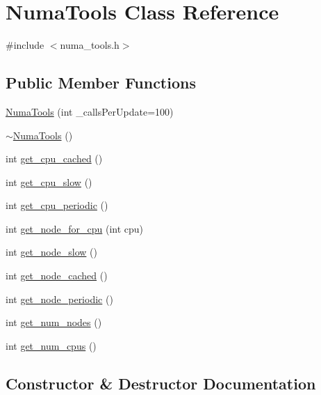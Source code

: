 \hypertarget{classNumaTools}{}\section{Numa\+Tools Class Reference}
\label{classNumaTools}


{\ttfamily \#include $<$numa\+\_\+tools.\+h$>$}

\subsection*{Public Member Functions}
\begin{DoxyCompactItemize}
\item 
\hyperlink{classNumaTools_aafcc9a9476cf975b4bd2f6a252f569aa}{Numa\+Tools} (int \+\_\+calls\+Per\+Update=100)
\item 
\hyperlink{classNumaTools_ae09d46d3c469d6151b93c3d96a1ff638}{$\sim$\+Numa\+Tools} ()
\item 
int \hyperlink{classNumaTools_aa1f63a07dbd4cf3795a9c37635995c8c}{get\+\_\+cpu\+\_\+cached} ()
\item 
int \hyperlink{classNumaTools_aac14b435a11ec52d02014783438d9ca4}{get\+\_\+cpu\+\_\+slow} ()
\item 
int \hyperlink{classNumaTools_ad67628c3c37072be89b377efd8aeca5d}{get\+\_\+cpu\+\_\+periodic} ()
\item 
int \hyperlink{classNumaTools_a15f467a2f27852c3f20c73c15e506cd1}{get\+\_\+node\+\_\+for\+\_\+cpu} (int cpu)
\item 
int \hyperlink{classNumaTools_ae073412f2df74a862553f218f887c94d}{get\+\_\+node\+\_\+slow} ()
\item 
int \hyperlink{classNumaTools_a8d7519f7caee2c3de6ffed4da724f125}{get\+\_\+node\+\_\+cached} ()
\item 
int \hyperlink{classNumaTools_a648fb73d8291e0d026c4e1921d17412b}{get\+\_\+node\+\_\+periodic} ()
\item 
int \hyperlink{classNumaTools_a9ba5a103276fdea894b82e7375ed1bf6}{get\+\_\+num\+\_\+nodes} ()
\item 
int \hyperlink{classNumaTools_af932989447a90e30f66f48d637fa46bf}{get\+\_\+num\+\_\+cpus} ()
\end{DoxyCompactItemize}


\subsection{Constructor \& Destructor Documentation}
\mbox{\label{classNumaTools_aafcc9a9476cf975b4bd2f6a252f569aa}} 

